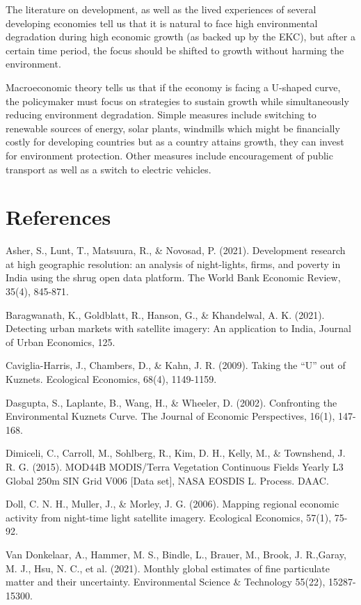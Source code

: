 \documentclass{article}
\begin{document}
The literature on development, as well as the lived experiences of several developing economies tell us that it is natural to face high environmental degradation during high economic growth (as backed up by the EKC), but after a certain time period, the focus should be shifted to growth without harming the environment. 

Macroeconomic theory tells us that if the economy is facing a U-shaped curve, the policymaker must focus on strategies to sustain growth while simultaneously reducing environment degradation. Simple measures include switching to renewable sources of energy, solar plants, windmills which might be financially costly for developing countries but as a country attains growth, they can invest for environment protection. Other measures include encouragement of public transport as well as a switch to electric vehicles.



\section{References}
Asher, S., Lunt, T., Matsuura, R., \& Novosad, P. (2021). Development research at high geographic resolution: an analysis of night-lights, firms, and poverty in India using the shrug open data platform. The World Bank Economic Review, 35(4), 845-871.

Baragwanath, K., Goldblatt, R., Hanson, G., \& Khandelwal, A. K. (2021). Detecting urban markets with satellite imagery: An application to India, Journal of Urban Economics, 125.

Caviglia-Harris, J., Chambers, D., \& Kahn, J. R. (2009). Taking the “U” out of Kuznets. Ecological Economics, 68(4), 1149-1159.

Dasgupta, S., Laplante, B., Wang, H., \& Wheeler, D. (2002). Confronting the Environmental Kuznets Curve. The Journal of Economic Perspectives, 16(1), 147-168.

Dimiceli, C., Carroll, M., Sohlberg, R., Kim, D. H., Kelly, M., \& Townshend, J. R. G. (2015). MOD44B MODIS/Terra Vegetation Continuous Fields Yearly L3 Global 250m SIN Grid V006 [Data set], NASA EOSDIS L. Process. DAAC.

Doll, C. N. H., Muller, J., \& Morley, J. G. (2006). Mapping regional economic activity from night-time light satellite imagery. Ecological Economics, 57(1), 75-92.

Van Donkelaar, A., Hammer, M. S., Bindle, L., Brauer, M., Brook, J. R.,Garay, M. J., Hsu, N. C., et al. (2021). Monthly global estimates of fine particulate matter and their uncertainty. Environmental Science \& Technology 55(22), 15287-15300.
\end{document}
